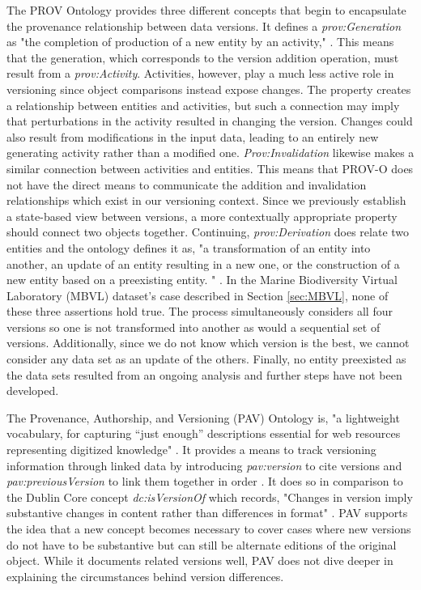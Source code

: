 The PROV Ontology provides three different concepts that begin to encapsulate the provenance relationship between data versions.
It defines a \textit{prov:Generation} as "the completion of production of a new entity by an activity," \cite{Lebo2013}.
This means that the generation, which corresponds to the version addition operation, must result from a \textit{prov:Activity}.
Activities, however, play a much less active role in versioning since object comparisons instead expose changes.
The property creates a relationship between entities and activities, but such a connection may imply that perturbations in the activity resulted in changing the version.
Changes could also result from modifications in the input data, leading to an entirely new generating activity rather than a modified one.
\textit{Prov:Invalidation} likewise makes a similar connection between activities and entities.
This means that PROV-O does not have the direct means to communicate the addition and invalidation relationships which exist in our versioning context.
Since we previously establish a state-based view between versions, a more contextually appropriate property should connect two objects together.
Continuing, \textit{prov:Derivation} does relate two entities and the ontology defines it as, "a transformation of an entity into another, an update of an entity resulting in a new one, or the construction of a new entity based on a preexisting entity. " \cite{Lebo2013}.
In the Marine Biodiversity Virtual Laboratory (MBVL) dataset's case described in Section \ref{sec:MBVL}, none of these three assertions hold true. 
The process simultaneously considers all four versions so one is not transformed into another as would a sequential set of versions.
Additionally, since we do not know which version is the best, we cannot consider any data set as an update of the others.
Finally, no entity preexisted as the data sets resulted from an ongoing analysis and further steps have not been developed.

The Provenance, Authorship, and Versioning (PAV) Ontology is, "a lightweight vocabulary, for capturing ``just enough” descriptions essential for web resources representing digitized knowledge" \cite{Ciccarese2013}.
It provides a means to track versioning information through linked data by introducing \textit{pav:version} to cite versions and \textit{pav:previousVersion} to link them together in order \cite{Ciccarese2013}.
It does so in comparison to the Dublin Core concept \textit{dc:isVersionOf} which records, "Changes in version imply substantive changes in content rather than differences in format" \cite{DCMI2012}.
PAV supports the idea that a new concept becomes necessary to cover cases where new versions do not have to be substantive but can still be alternate editions of the original object.
While it documents related versions well, PAV does not dive deeper in explaining the circumstances behind version differences.

